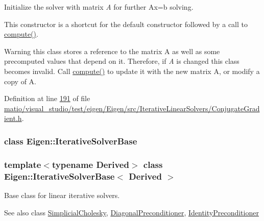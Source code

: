 Initialize the solver with matrix {\itshape A} for further {\ttfamily Ax=b} solving.

This constructor is a shortcut for the default constructor followed by a call to \hyperlink{group___iterative_linear_solvers___module_a7dfa55c55e82d697bde227696a630914}{compute()}.

\begin{DoxyWarning}{Warning}
this class stores a reference to the matrix A as well as some precomputed values that depend on it. Therefore, if {\itshape A} is changed this class becomes invalid. Call \hyperlink{group___iterative_linear_solvers___module_a7dfa55c55e82d697bde227696a630914}{compute()} to update it with the new matrix A, or modify a copy of A. 
\end{DoxyWarning}


Definition at line \hyperlink{matio_2visual__studio_2test_2eigen_2_eigen_2src_2_iterative_linear_solvers_2_conjugate_gradient_8h_source_l00191}{191} of file \hyperlink{matio_2visual__studio_2test_2eigen_2_eigen_2src_2_iterative_linear_solvers_2_conjugate_gradient_8h_source}{matio/visual\+\_\+studio/test/eigen/\+Eigen/src/\+Iterative\+Linear\+Solvers/\+Conjugate\+Gradient.\+h}.

\label{class_eigen_1_1_iterative_solver_base}
\subsubsection{class Eigen\+:\+:Iterative\+Solver\+Base}
\subsubsection*{template$<$typename Derived$>$\newline
class Eigen\+::\+Iterative\+Solver\+Base$<$ Derived $>$}

Base class for linear iterative solvers. 

\begin{DoxySeeAlso}{See also}
class \hyperlink{group___sparse_cholesky___module_class_eigen_1_1_simplicial_cholesky}{Simplicial\+Cholesky}, \hyperlink{group___iterative_linear_solvers___module_class_eigen_1_1_diagonal_preconditioner}{Diagonal\+Preconditioner}, \hyperlink{group___iterative_linear_solvers___module_class_eigen_1_1_identity_preconditioner}{Identity\+Preconditioner} 
\end{DoxySeeAlso}


